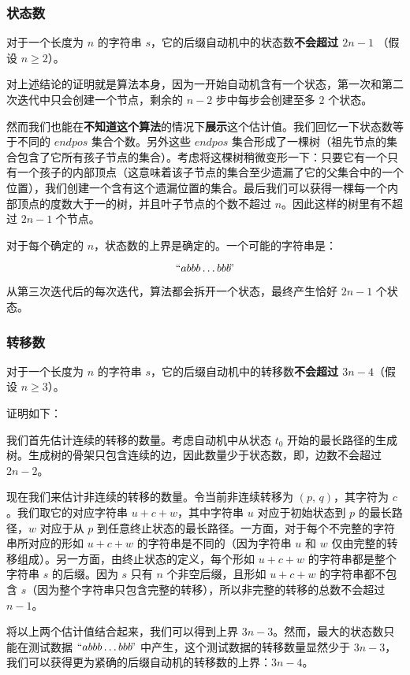 \subsubsection{状态数}

对于一个长度为 $n$ 的字符串 $s$，它的后缀自动机中的状态数\textbf{不会超过 $2n-1$} （假设 $n\ge2$）。

对上述结论的证明就是算法本身，因为一开始自动机含有一个状态，第一次和第二次迭代中只会创建一个节点，剩余的 $n-2$ 步中每步会创建至多 $2$ 个状态。

然而我们也能在\textbf{不知道这个算法}的情况下\textbf{展示}这个估计值。我们回忆一下状态数等于不同的 $endpos$ 集合个数。另外这些 $endpos$ 集合形成了一棵树（祖先节点的集合包含了它所有孩子节点的集合）。考虑将这棵树稍微变形一下：只要它有一个只有一个孩子的内部顶点（这意味着该子节点的集合至少遗漏了它的父集合中的一个位置），我们创建一个含有这个遗漏位置的集合。最后我们可以获得一棵每一个内部顶点的度数大于一的树，并且叶子节点的个数不超过 $n$。因此这样的树里有不超过 $2n-1$ 个节点。

对于每个确定的 $n$，状态数的上界是确定的。一个可能的字符串是：

$$
``abbb\ldots bbb\!"
$$

从第三次迭代后的每次迭代，算法都会拆开一个状态，最终产生恰好 $2n-1$ 个状态。

\subsubsection{转移数}

对于一个长度为 $n$ 的字符串 $s$，它的后缀自动机中的转移数\textbf{不会超过 $3n-4$}（假设 $n\ge 3$）。

证明如下：

我们首先估计连续的转移的数量。考虑自动机中从状态 $t_0$ 开始的最长路径的生成树。生成树的骨架只包含连续的边，因此数量少于状态数，即，边数不会超过 $2n-2$。

现在我们来估计非连续的转移的数量。令当前非连续转移为 $(p,\,q)$，其字符为 $c$。我们取它的对应字符串 $u+c+w$，其中字符串 $u$ 对应于初始状态到 $p$ 的最长路径，$w$ 对应于从 $p$ 到任意终止状态的最长路径。一方面，对于每个不完整的字符串所对应的形如 $u+c+w$ 的字符串是不同的（因为字符串 $u$ 和 $w$ 仅由完整的转移组成）。另一方面，由终止状态的定义，每个形如 $u+c+w$ 的字符串都是整个字符串 $s$ 的后缀。因为 $s$ 只有 $n$ 个非空后缀，且形如 $u+c+w$ 的字符串都不包含 $s$（因为整个字符串只包含完整的转移），所以非完整的转移的总数不会超过 $n-1$。

将以上两个估计值结合起来，我们可以得到上界 $3n-3$。然而，最大的状态数只能在测试数据 $``abbb\ldots bbb\!"$ 中产生，这个测试数据的转移数量显然少于 $3n-3$，我们可以获得更为紧确的后缀自动机的转移数的上界：$3n-4$。

